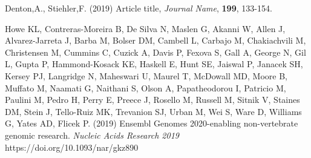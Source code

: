 \documentclass{bioinfo}
\begin{document}
\begin{thebibliography}{}

Denton,A., Stiehler,F. (2019) Article title, {\it Journal Name}, {\bf 199}, 133-154.

Howe KL, Contreras-Moreira B, De Silva N, Maslen G, Akanni W, Allen J, Alvarez-Jarreta J, Barba M, Bolser DM, Cambell L, Carbajo M, Chakiachvili M, Christensen M, Cummins C, Cuzick A, Davis P, Fexova S, Gall A, George N, Gil L, Gupta P, Hammond-Kosack KE, Haskell E, Hunt SE, Jaiswal P, Janacek SH, Kersey PJ, Langridge N, Maheswari U, Maurel T, McDowall MD, Moore B, Muffato M, Naamati G, Naithani S, Olson A, Papatheodorou I, Patricio M, Paulini M, Pedro H, Perry E, Preece J, Rosello M, Russell M, Sitnik V, Staines DM, Stein J, Tello-Ruiz MK, Trevanion SJ, Urban M, Wei S, Ware D, Williams G, Yates AD, Flicek P. (2019) Ensembl Genomes 2020-enabling non-vertebrate genomic research. {\it Nucleic Acids Research 2019} https://doi.org/10.1093/nar/gkz890

\end{thebibliography}
\end{document}
